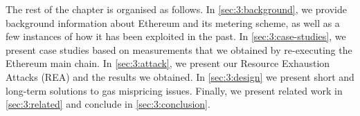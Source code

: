  The rest of the chapter is organised as follows.
In \autoref{sec:3:background}, we provide background information about Ethereum and its metering scheme, as well as a few instances of how it has been exploited in the past.
In \autoref{sec:3:case-studies}, we present case studies based on measurements that we obtained by re-executing the Ethereum main chain.
In \autoref{sec:3:attack}, we present our Resource Exhaustion Attacks (REA) and the results we obtained. In \autoref{sec:3:design} we present short and long-term solutions to gas mispricing issues.
Finally, we present related work in \autoref{sec:3:related} and conclude in \autoref{sec:3:conclusion}.
